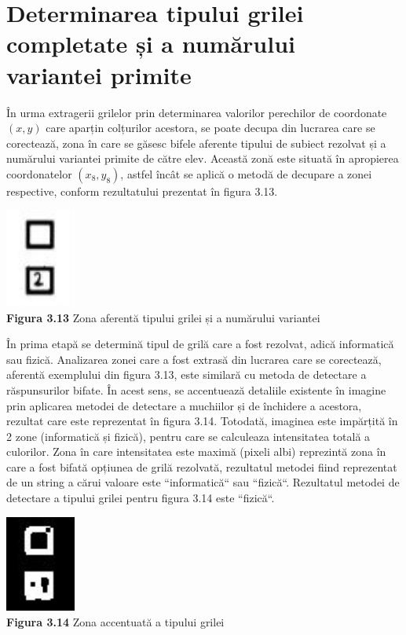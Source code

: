 \documentclass[a4paper,12pt]{report}
\newcommand\tab[1][1cm]{\hspace*{#1}}
\begin{document}
\section {Determinarea tipului grilei completate și a numărului \\variantei primite}
\tab În urma extragerii grilelor prin determinarea valorilor perechilor de coordonate $(x, y)$ care aparțin colțurilor acestora, se poate decupa din lucrarea care se corectează, zona în care se găsesc bifele aferente tipului de subiect rezolvat și a numărului variantei primite de către elev. Această zonă este situată în apropierea coordonatelor $(x_{8}, y_{8})$, astfel încât se aplică o metodă de decupare a zonei respective, conform rezultatului prezentat în figura 3.13.  
\begin {center} 
	\begin {footnotesize} 
		\includegraphics[width = 23mm]{fig3_13} \\
		\textbf  {Figura 3.13}  Zona aferentă tipului grilei și a numărului variantei
	\end {footnotesize} 
\end {center}
\tab În prima etapă se determină tipul de grilă care a fost rezolvat, adică informatică sau fizică. Analizarea zonei care a fost extrasă din lucrarea care se corectează, aferentă exemplului din figura 3.13, este similară cu metoda de detectare a răspunsurilor bifate. În acest sens, se accentuează detaliile existente în imagine prin aplicarea metodei de detectare a muchiilor și de închidere a acestora, rezultat care este reprezentat în figura 3.14. Totodată, imaginea este impărțită în 2 zone (informatică și fizică), pentru care se calculeaza intensitatea totală a culorilor. Zona în care intensitatea este maximă (pixeli albi) reprezintă zona în care a fost bifată opțiunea de grilă rezolvată, rezultatul metodei fiind reprezentat de un string a cărui valoare este ``informatică`` sau ``fizică``. Rezultatul metodei de detectare a tipului grilei pentru figura 3.14 este ``fizică``.
\begin {center} 
	\begin {footnotesize} 
		\includegraphics[width = 23mm]{fig3_14} \\
		\textbf  {Figura 3.14}  Zona accentuată a tipului grilei 
	\end {footnotesize} 
\end {center}
\end{document}
